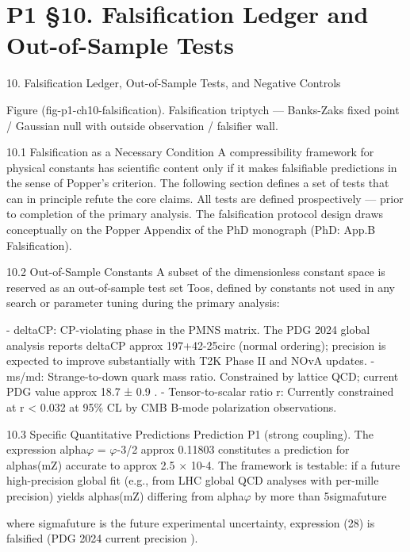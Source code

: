 
\section{P1 §10. Falsification Ledger and Out-of-Sample Tests}

10. Falsification Ledger, Out-of-Sample Tests, and Negative
  Controls

    Figure (fig-p1-ch10-falsification). Falsification triptych --- Banks-Zaks fixed point / Gaussian null
                                 with outside observation / falsifier wall.

  10.1 Falsification as a Necessary Condition
  A compressibility framework for physical constants has scientific content only if it
  makes falsifiable predictions in the sense of Popper's criterion. The following section
  defines a set of tests that can in principle refute the core claims. All tests are defined
  prospectively --- prior to completion of the primary analysis. The falsification protocol
  design draws conceptually on the Popper Appendix of the PhD monograph (PhD: App.B
  Falsification).

  10.2 Out-of-Sample Constants
  A subset of the dimensionless constant space is reserved as an out-of-sample test set
  Toos, defined by constants not used in any search or parameter tuning during the
  primary analysis:

  - deltaCP: CP-violating phase in the PMNS matrix. The PDG 2024 global analysis
  reports deltaCP approx 197+42-25{}circ (normal ordering); precision is expected to
  improve substantially with T2K Phase II and NOvA updates.
  - ms/md: Strange-to-down quark mass ratio. Constrained by lattice QCD; current PDG
  value approx 18.7 ± 0.9 \citep{pdg2024}.
  - Tensor-to-scalar ratio r: Currently constrained at r < 0.032 at 95\% CL by CMB B-mode
  polarization observations.

  10.3 Specific Quantitative Predictions
  Prediction P1 (strong coupling). The expression alpha$\varphi$ = $\varphi$-3/2 approx 0.11803
  constitutes a prediction for alphas(mZ) accurate to approx 2.5 $\times$ 10-4. The framework is
  testable: if a future high-precision global fit (e.g., from LHC global QCD analyses with
  per-mille precision) yields alphas(mZ) differing from alpha$\varphi$ by more than 5sigmafuture

  where sigmafuture is the future experimental uncertainty, expression (28) is falsified
  (PDG 2024 current precision \citep{pdg2024}).

